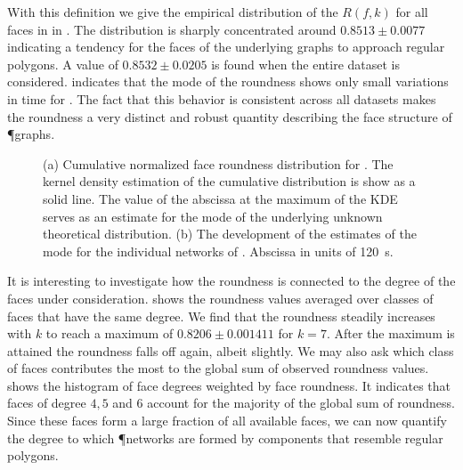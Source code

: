 		With this definition we give the empirical distribution of the $R(f,k)$ for all faces in  in . The distribution is sharply concentrated around $0.8513 \pm 0.0077$ indicating a tendency for the faces of the underlying graphs to approach regular polygons. A value of $0.8532 \pm 0.0205$ is found when the entire dataset is considered.  indicates that the mode of the roundness shows only small variations in time for . The fact that this behavior is consistent across all datasets makes the roundness a very distinct and robust quantity describing the face structure of \P graphs.

		\begin{figure}
			\centering
			\qquad

			\caption[Face roundness distribution]{(a) Cumulative normalized face roundness distribution for . The kernel density estimation of the cumulative distribution is show as a solid line. The value of the abscissa at the maximum of the KDE serves as an estimate for the mode of the underlying unknown theoretical distribution. (b) The development of the estimates of the mode for the individual networks of . Abscissa in units of \SI{120}{\second}.}
		\end{figure}

		It is interesting to investigate how the roundness is connected to the degree of the faces under consideration.  shows the roundness values averaged over classes of faces that have the same degree. We find that the roundness steadily increases with $k$ to reach a maximum of $0.8206 \pm 0.001411$ for $k=7$. After the maximum is attained the roundness falls off again, albeit slightly. We may also ask which class of faces contributes the most to the global sum of observed roundness values.  shows the histogram of face degrees weighted by face roundness. It indicates that faces of degree  $4,5$ and $6$ account for the majority of the global sum of roundness. Since these faces form a large fraction of all available faces, we can now quantify the degree to which \P networks are formed by components that resemble regular polygons.

